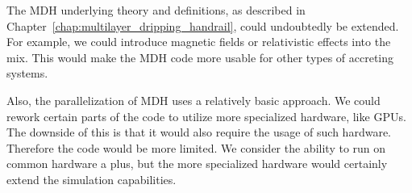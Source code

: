     The MDH underlying theory and definitions, as described in Chapter~\ref{chap:multilayer_dripping_handrail}, could undoubtedly be extended. For example, we could introduce magnetic fields or relativistic effects into the mix. This would make the MDH code more usable for other types of accreting systems.

    Also, the parallelization of MDH uses a relatively basic approach. We could rework certain parts of the code to utilize more specialized hardware, like GPUs. The downside of this is that it would also require the usage of such hardware. Therefore the code would be more limited. We consider the ability to run on common hardware a plus, but the more specialized hardware would certainly extend the simulation capabilities. 
